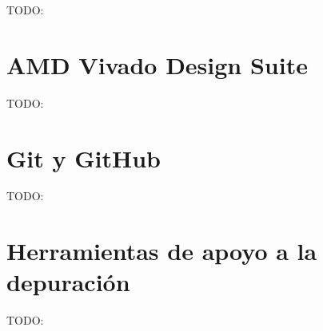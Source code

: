 TODO:

\section{AMD Vivado Design Suite}

TODO:

\section{Git y GitHub}

TODO:

\section{Herramientas de apoyo a la depuración}

TODO: